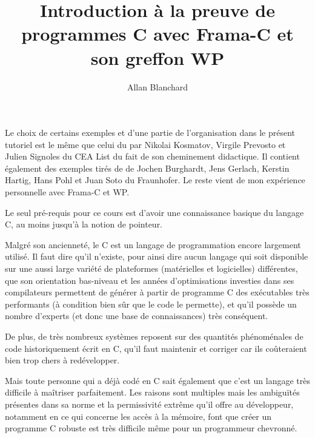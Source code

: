 \documentclass[middle]{zmdocument}
\title{Introduction à la preuve de programmes C avec Frama-C et son greffon WP}
\author{Allan Blanchard}
\begin{document}
\maketitle
\tableofcontents



\begin{Information}
Le choix de certains exemples et d'une partie de l'organisation dans le présent 
tutoriel est le même que celui du 
par Nikolai Kosmatov, Virgile Prevosto et Julien Signoles du CEA List du fait de
son cheminement didactique. Il contient également des exemples tirés de 
\textit{} 
de Jochen Burghardt, Jens Gerlach, Kerstin Hartig, Hans Pohl et Juan Soto du 
Fraunhofer. Le reste vient de mon expérience personnelle avec Frama-C et WP.

Le seul pré-requis pour ce cours est d'avoir une connaissance basique du 
langage C, au moins jusqu'à la notion de pointeur.
\end{Information}


Malgré son ancienneté, le C est un langage de programmation encore largement 
utilisé. Il faut dire qu'il n'existe, pour ainsi dire aucun langage qui soit 
disponible sur une aussi large variété de plateformes (matérielles et 
logicielles) différentes, que son orientation bas-niveau et les années 
d'optimisations investies dans ses compilateurs permettent de générer à 
partir de programme C des exécutables très performants (à condition bien sûr 
que le code le permette), et qu'il possède un nombre d'experts (et donc une 
base de connaissances) très conséquent.



De plus, de très nombreux systèmes reposent sur des quantités phénoménales de
code historiquement écrit en C, qu'il faut maintenir et corriger car ils 
coûteraient bien trop chers à redévelopper.



Mais toute personne qui a déjà codé en C sait également que c'est un langage 
très difficile à maîtriser parfaitement. Les raisons sont multiples mais les 
ambiguïtés présentes dans sa norme et la permissivité extrême qu'il offre au 
développeur, notamment en ce qui concerne les accès à la mémoire, font que 
créer un programme C robuste est très difficile même pour un programmeur 
chevronné.
\end{document}
